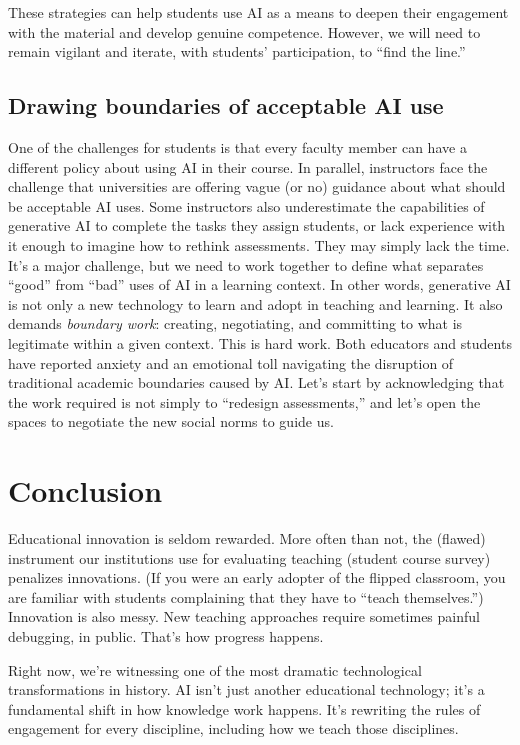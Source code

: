 \documentclass{tufte-handout}
\begin{document}
These strategies can help students use AI as a means to deepen their engagement with the material and develop genuine competence. However, we will need to remain vigilant and iterate, with students’ participation, to ``find the line.''

\subsection{Drawing boundaries of acceptable AI use}

One of the challenges for students is that every faculty member can have a different policy about using AI in their course. In parallel, instructors face the challenge that universities are offering vague (or no) guidance about what should be acceptable AI uses. Some instructors also underestimate the capabilities of generative AI to complete the tasks they assign students, or lack experience with it enough to imagine how to rethink assessments. They may simply lack the time. It’s a major challenge, but we need to work together to define what separates ``good'' from ``bad'' uses of AI in a learning context. In other words, generative AI is not only a new technology to learn and adopt in teaching and learning. It also demands \emph{boundary work}: creating, negotiating, and committing to what is legitimate within a given context. This is hard work. Both educators and students have reported anxiety and an emotional toll navigating the disruption of traditional academic boundaries caused by AI.\cite{corbin2025s} Let’s start by acknowledging that the work required is not simply to ``redesign assessments,'' and let’s open the spaces to negotiate the new social norms to guide us.

\section{Conclusion}

Educational innovation is seldom rewarded. More often than not, the (flawed) instrument our institutions use for evaluating teaching (student course survey) penalizes innovations. (If you were an early adopter of the flipped classroom, you are familiar with students complaining that they have to ``teach themselves.'') Innovation is also messy. New teaching approaches require sometimes painful debugging, in public. That’s how progress happens.

Right now, we’re witnessing one of the most dramatic technological transformations in history. AI isn't just another educational technology; it's a fundamental shift in how knowledge work happens. It's rewriting the rules of engagement for every discipline, including how we teach those disciplines.
\end{document}
